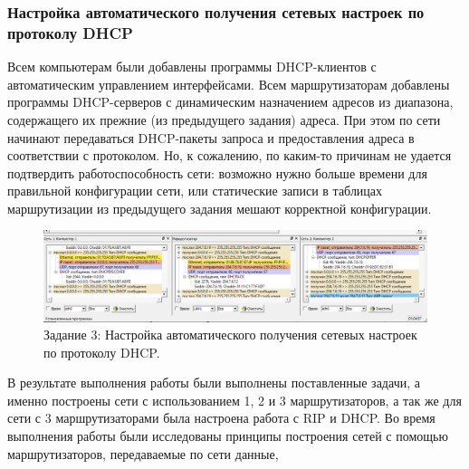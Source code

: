 \subsubsection{Настройка автоматического получения сетевых настроек по протоколу DHCP}

Всем компьютерам были добавлены программы DHCP-клиентов с автоматическим управлением интерфейсами. Всем маршрутизаторам добавлены программы DHCP-серверов с динамическим назначением адресов из диапазона, содержащего их прежние (из предыдущего задания) адреса. При этом по сети начинают передаваться DHCP-пакеты запроса и предоставления адреса в соответствии с протоколом. Но, к сожалению, по каким-то причинам не удается подтвердить работоспособность сети: возможно нужно больше времени для правильной конфигурации сети, или статические записи в таблицах маршрутизации из предыдущего задания мешают корректной конфигурации.

\begin{figure}[H]
    \centering
    \includegraphics[width=\linewidth]{res/task-3-dhcp.png}
    \caption{Задание 3: Настройка автоматического получения сетевых настроек по протоколу DHCP.}
    \label{fig:task-3-dhcp}
\end{figure}




В результате выполнения работы были выполнены поставленные задачи, а именно построены сети с использованием 1, 2 и 3 маршрутизаторов, а так же для сети с 3 маршрутизаторами была настроена работа с RIP и DHCP. Во время выполнения работы были исследованы принципы построения сетей с помощью маршрутизаторов, передаваемые по сети данные, 




